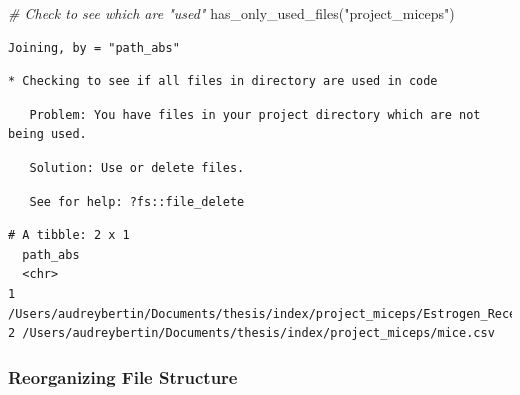 \documentclass[12pt,twoside]{reedthesis}
\newenvironment{Shaded}{\begin{snugshade}}{\end{snugshade}}
\newcommand{\CommentTok}[1]{\textcolor[rgb]{0.56,0.35,0.01}{\textit{#1}}}
\newcommand{\FunctionTok}[1]{\textcolor[rgb]{0.00,0.00,0.00}{#1}}
\newcommand{\NormalTok}[1]{#1}
\newcommand{\StringTok}[1]{\textcolor[rgb]{0.31,0.60,0.02}{#1}}
\begin{document}
\begin{Shaded}
\begin{Highlighting}[]
\CommentTok{\# Check to see which are "used"}
\FunctionTok{has\_only\_used\_files}\NormalTok{(}\StringTok{"project\_miceps"}\NormalTok{)}
\end{Highlighting}
\end{Shaded}
\begin{verbatim}
Joining, by = "path_abs"
\end{verbatim}
\begin{verbatim}
* Checking to see if all files in directory are used in code
\end{verbatim}
\begin{verbatim}
   Problem: You have files in your project directory which are not being used.
\end{verbatim}
\begin{verbatim}
   Solution: Use or delete files.
\end{verbatim}
\begin{verbatim}
   See for help: ?fs::file_delete
\end{verbatim}
\begin{verbatim}
# A tibble: 2 x 1
  path_abs                                                                      
  <chr>                                                                         
1 /Users/audreybertin/Documents/thesis/index/project_miceps/Estrogen_Receptors.~
2 /Users/audreybertin/Documents/thesis/index/project_miceps/mice.csv            
\end{verbatim}
\hypertarget{reorganizing-file-structure}{%
\subsubsection{Reorganizing File Structure}\label{reorganizing-file-structure}}
\end{document}
